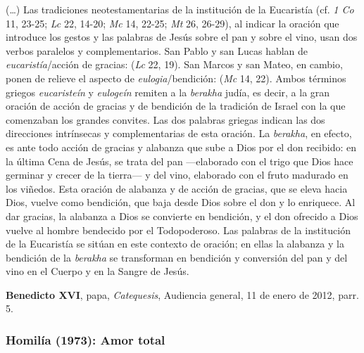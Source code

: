 \begin{patercite}
(\ldots) Las tradiciones neotestamentarias de la institución de la Eucaristía (cf. \emph{1 Co} 11, 23-25; \emph{Lc} 22, 14-20; \emph{Mc} 14, 22-25; \emph{Mt} 26, 26-29), al indicar la oración que introduce los gestos y las palabras de Jesús sobre el pan y sobre el vino, usan dos verbos paralelos y complementarios. San Pablo y san Lucas hablan de \emph{eucaristía}/acción de gracias:  (\emph{Lc} 22, 19). San Marcos y san Mateo, en cambio, ponen de relieve el aspecto de \emph{eulogia}/bendición:  (\emph{Mc} 14, 22). Ambos términos griegos \emph{eucaristeín} y \emph{eulogeín} remiten a la \emph{berakha} judía, es decir, a la gran oración de acción de gracias y de bendición de la tradición de Israel con la que comenzaban los grandes convites. Las dos palabras griegas indican las dos direcciones intrínsecas y complementarias de esta oración. La \emph{berakha}, en efecto, es ante todo acción de gracias y alabanza que sube a Dios por el don recibido: en la última Cena de Jesús, se trata del pan ---elaborado con el trigo que Dios hace germinar y crecer de la tierra--- y del vino, elaborado con el fruto madurado en los viñedos. Esta oración de alabanza y de acción de gracias, que se eleva hacia Dios, vuelve como bendición, que baja desde Dios sobre el don y lo enriquece. Al dar gracias, la alabanza a Dios se convierte en bendición, y el don ofrecido a Dios vuelve al hombre bendecido por el Todopoderoso. Las palabras de la institución de la Eucaristía se sitúan en este contexto de oración; en ellas la alabanza y la bendición de la \emph{berakha} se transforman en bendición y conversión del pan y del vino en el Cuerpo y en la Sangre de Jesús.

\textbf{Benedicto XVI}, papa, \textit{Catequesis}, Audiencia general, 11 de enero de 2012, parr. 5.
\end{patercite}

\newpage

\subsubsection{Homilía (1973): Amor total}


